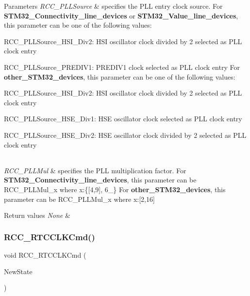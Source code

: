 \begin{DoxyParams}{Parameters}
{\em R\+C\+C\+\_\+\+P\+L\+L\+Source} & specifies the P\+LL entry clock source. For {\bfseries{S\+T\+M32\+\_\+\+Connectivity\+\_\+line\+\_\+devices}} or {\bfseries{S\+T\+M32\+\_\+\+Value\+\_\+line\+\_\+devices}}, this parameter can be one of the following values\+: \begin{DoxyItemize}
\item R\+C\+C\+\_\+\+P\+L\+L\+Source\+\_\+\+H\+S\+I\+\_\+\+Div2\+: H\+SI oscillator clock divided by 2 selected as P\+LL clock entry \item R\+C\+C\+\_\+\+P\+L\+L\+Source\+\_\+\+P\+R\+E\+D\+I\+V1\+: P\+R\+E\+D\+I\+V1 clock selected as P\+LL clock entry For {\bfseries{other\+\_\+\+S\+T\+M32\+\_\+devices}}, this parameter can be one of the following values\+: \item R\+C\+C\+\_\+\+P\+L\+L\+Source\+\_\+\+H\+S\+I\+\_\+\+Div2\+: H\+SI oscillator clock divided by 2 selected as P\+LL clock entry \item R\+C\+C\+\_\+\+P\+L\+L\+Source\+\_\+\+H\+S\+E\+\_\+\+Div1\+: H\+SE oscillator clock selected as P\+LL clock entry \item R\+C\+C\+\_\+\+P\+L\+L\+Source\+\_\+\+H\+S\+E\+\_\+\+Div2\+: H\+SE oscillator clock divided by 2 selected as P\+LL clock entry \end{DoxyItemize}
\\
\hline
{\em R\+C\+C\+\_\+\+P\+L\+L\+Mul} & specifies the P\+LL multiplication factor. For {\bfseries{S\+T\+M32\+\_\+\+Connectivity\+\_\+line\+\_\+devices}}, this parameter can be R\+C\+C\+\_\+\+P\+L\+L\+Mul\+\_\+x where x\+:\{\mbox{[}4,9\mbox{]}, 6\+\_\} For {\bfseries{other\+\_\+\+S\+T\+M32\+\_\+devices}}, this parameter can be R\+C\+C\+\_\+\+P\+L\+L\+Mul\+\_\+x where x\+:\mbox{[}2,16\mbox{]}\\
\hline
\end{DoxyParams}

\begin{DoxyRetVals}{Return values}
{\em None} & \\
\hline
\end{DoxyRetVals}
\mbox{\label{group___r_c_c___exported___functions_ga9802f84846df2cea8e369234ed13b159}} 
\subsubsection{\texorpdfstring{RCC\_RTCCLKCmd()}{RCC\_RTCCLKCmd()}}
{\footnotesize\ttfamily void R\+C\+C\+\_\+\+R\+T\+C\+C\+L\+K\+Cmd (\begin{DoxyParamCaption}\item[{\mbox{\hyperlink{group___exported__types_gac9a7e9a35d2513ec15c3b537aaa4fba1}{Functional\+State}}}]{New\+State }\end{DoxyParamCaption})}



